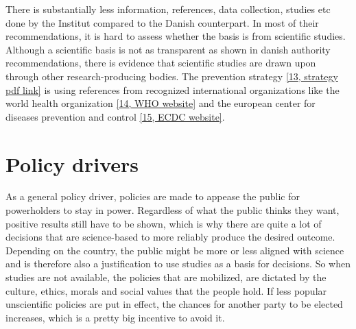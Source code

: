 There is substantially less information, references, data collection, studies etc done by the Institut compared to the Danish counterpart.
In most of their recommendations, it is hard to assess whether the basis is from scientific studies.
Although a scientific basis is not as transparent as shown in danish authority recommendations, there is evidence that scientific studies are drawn upon through other research-producing bodies.
The prevention strategy \href{https://www.iss.it/en/web/guest/home?p_p_id=com_liferay_portal_search_web_portlet_SearchPortlet&p_p_lifecycle=0&p_p_state=maximized&p_p_mode=view&_com_liferay_portal_search_web_portlet_SearchPortlet_mvcPath=%2Fview_content.jsp&_com_liferay_portal_search_web_portlet_SearchPortlet_assetEntryId=5498191&_com_liferay_portal_search_web_portlet_SearchPortlet_type=document&p_l_back_url=https%3A%2F%2Fwww.iss.it%2Fen%2Fweb%2Fguest%2Fhome%3Fp_p_id%3Dcom_liferay_portal_search_web_portlet_SearchPortlet%26p_p_lifecycle%3D0%26p_p_state%3Dmaximized%26p_p_mode%3Dview%26_com_liferay_portal_search_web_portlet_SearchPortlet_redirect%3Dhttps%253A%252F%252Fwww.iss.it%252Fen%252Fweb%252Fguest%252Fhome%253Fp_p_id%253Dcom_liferay_portal_search_web_portlet_SearchPortlet%2526p_p_lifecycle%253D0%2526p_p_state%253Dnormal%2526p_p_mode%253Dview%26_com_liferay_portal_search_web_portlet_SearchPortlet_mvcPath%3D%252Fsearch.jsp%26_com_liferay_portal_search_web_portlet_SearchPortlet_keywords%3Dface%2Bmasks%26_com_liferay_portal_search_web_portlet_SearchPortlet_formDate%3D1660826067982%26_com_liferay_portal_search_web_portlet_SearchPortlet_scope%3Dthis-site}{[13, strategy pdf link]} is using references from recognized international organizations like the world health organization \href{https://www.who.int/}{[14, WHO website]} and the european center for diseases prevention and control \href{https://www.ecdc.europa.eu/en}{[15, ECDC website]}.




\section*{Policy drivers}
As a general policy driver, policies are made to appease the public for powerholders to stay in power.
Regardless of what the public thinks they want, positive results still have to be shown, which is why there are quite a lot of decisions that are science-based to more reliably produce the desired outcome.
Depending on the country, the public might be more or less aligned with science and is therefore also a justification to use studies as a basis for decisions.
So when studies are not available, the policies that are mobilized, are dictated by the culture, ethics, morals and social values that the people hold.
If less popular unscientific policies are put in effect, the chances for another party to be elected increases, which is a pretty big incentive to avoid it. 

